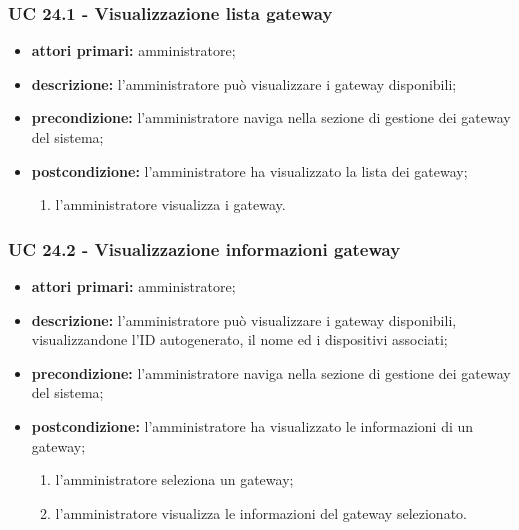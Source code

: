 			\subsubsection{UC 24.1 - Visualizzazione lista gateway}
			\begin{itemize}
				\item \textbf{attori primari:} amministratore;
				\item \textbf{descrizione:} l'amministratore può visualizzare i gateway disponibili;
				\item \textbf{precondizione:} l'amministratore naviga nella sezione di gestione dei gateway del sistema;
				\item \textbf{postcondizione:} l'amministratore ha visualizzato la lista dei gateway;
				\begin{enumerate}
					\item{l'amministratore visualizza i gateway.}
				\end{enumerate} 
			\end{itemize}

			\subsubsection{UC 24.2 - Visualizzazione informazioni gateway}
			\begin{itemize}
				\item \textbf{attori primari:} amministratore;
				\item \textbf{descrizione:} l'amministratore può visualizzare i gateway disponibili, visualizzandone l'ID autogenerato, il nome ed i dispositivi associati;
				\item \textbf{precondizione:} l'amministratore naviga nella sezione di gestione dei gateway del sistema;
				\item \textbf{postcondizione:} l'amministratore ha visualizzato le informazioni di un gateway;
				\begin{enumerate}
					\item l'amministratore seleziona un gateway;
					\item l'amministratore visualizza le informazioni del gateway selezionato.
				\end{enumerate} 
			\end{itemize}

